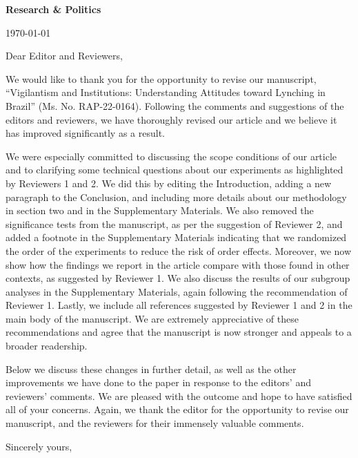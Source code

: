 \documentclass[a4paper,12pt]{article}
\begin{document}
\doublespacing

\noindent \textbf{Research \& Politics}

\noindent \today 

\vspace{.5cm}

\noindent Dear Editor and Reviewers,

\vspace{.5cm}

We would like to thank you for the opportunity to revise our manuscript,
``Vigilantism and Institutions: Understanding Attitudes toward Lynching in
Brazil'' (Ms. No. RAP-22-0164). Following the comments and suggestions of the
editors and reviewers, we have thoroughly revised our article and we believe it
has improved significantly as a result. 

We were especially committed to discussing the scope conditions of our article
and to clarifying some technical questions about our experiments as highlighted
by Reviewers 1 and 2. We did this by editing the Introduction, adding a new
paragraph to the Conclusion, and including more details about our methodology
in section two and in the Supplementary Materials. We also removed the
significance tests from the manuscript, as per the suggestion of Reviewer 2,
and added a footnote in the Supplementary Materials indicating that we
randomized the order of the experiments to reduce the risk of order effects.
Moreover, we now show how the findings we report in the article compare with
those found in other contexts, as suggested by Reviewer 1. We also discuss the
results of our subgroup analyses in the Supplementary Materials, again
following the recommendation of Reviewer 1. Lastly, we include all references
suggested by Reviewer 1 and 2 in the main body of the manuscript. We are
extremely appreciative of these recommendations and agree that the manuscript
is now stronger and appeals to a broader readership.

Below we discuss these changes in further detail, as well as the other
improvements we have done to the paper in response to the editors' and
reviewers' comments. We are pleased with the outcome and hope to have satisfied
all of your concerns. Again, we thank the editor for the opportunity to revise
our manuscript, and the reviewers for their immensely valuable comments.

\vspace{.5cm}

\noindent Sincerely yours,

\vspace{.5cm}
\end{document}
